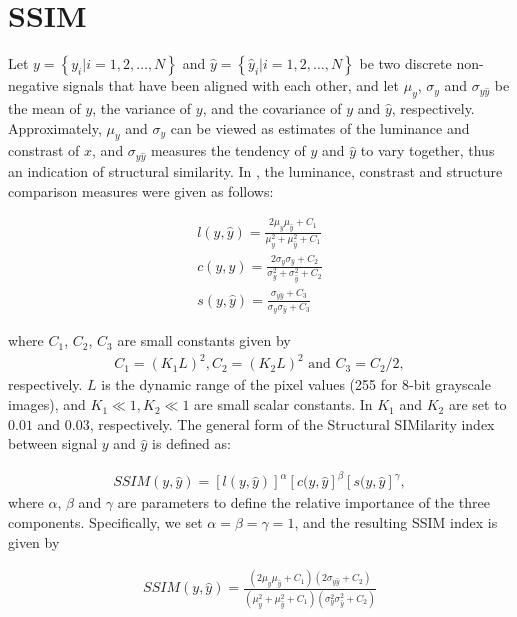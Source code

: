 \section{SSIM}
\label{sec:ssim}

Let $y = \left\{ y_i | i = 1, 2, \dots, N \right\}$ and $\hat{y} = \left\{ \hat{y}_i | i = 1, 2, \dots, N \right\}$ be two discrete non-negative signals that have been aligned with each other, and let $\mu_y$, $\sigma_y$ and $\sigma_{y\hat{y}}$ be the mean of $y$, the variance of $y$, and the covariance of $y$ and $\hat{y}$, respectively. Approximately, $\mu_y$ and $\sigma_y$ can be viewed as estimates of the luminance and constrast of $x$, and $\sigma_{y\hat{y}}$ measures the tendency of $y$ and $\hat{y}$ to vary together, thus an indication of structural similarity. In \cite{wang2004image}, the luminance, constrast and structure comparison measures were given as follows:

\begin{align}
l(y, \hat{y}) = \frac{2 \mu_y \mu_{\hat{y}} + C_1}{\mu^2_y + \mu^2_{\hat{y}} + C_1}\label{eq:luminance} \\
c(y, \hat{y}) = \frac{2\sigma_y\sigma_{\hat{y}} + C_2}{\sigma^2_y + \sigma^2_{\hat{y}} + C_2}\label{eq:constrast} \\
s(y, \hat{y}) = \frac{\sigma_{y\hat{y}} + C_3}{\sigma_y \sigma_{\hat{y}} + C_3}\label{eq:structure}
\end{align}

where $C_1$, $C_2$, $C_3$ are small constants given by
\begin{align}
C_1 = \left( K_1 L \right)^2, C_2 = \left( K_2 L \right)^2 \text{ and } C_3 = C_2 / 2,
\end{align}
respectively. $L$ is the dynamic range of the pixel values (255 for 8-bit grayscale images), and $K_1 \ll 1, K_2 \ll 1$ are small scalar constants. In \cite{wang2004image} $K_1$ and $K_2$ are set to $0.01$ and $0.03$, respectively. The general form of the Structural SIMilarity index between signal $y$ and $\hat{y}$ is defined as:

\begin{align}
SSIM(y, \hat{y}) = [l(y, \hat{y})]^{\alpha} [c(y, \hat{y}]^{\beta} [s(y, \hat{y}]^{\gamma},
\end{align}
where $\alpha$, $\beta$ and $\gamma$ are parameters to define the relative importance of the three components. Specifically, we set $\alpha = \beta = \gamma = 1$, and the resulting SSIM index is given by

\begin{align}
SSIM(y, \hat{y}) = \frac{
    \left( 2 \mu_{y} \mu_{\hat{y}} + C_1 \right) \left( 2 \sigma_{y \hat{y}} + C_2 \right)
}{
    \left( \mu_{y}^2 + \mu_{\hat{y}}^2 + C_1 \right) \left( \sigma_{y}^2 \sigma_{\hat{y}}^2 + C_2 \right)
}
\end{align}

